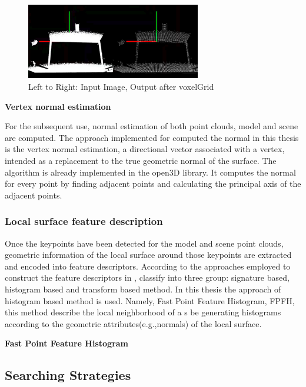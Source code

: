 \begin{figure}[!h]
\begin{center}
\includegraphics[width=3in]{figures03/voxelcloud1.png}
\caption{Left to Right: Input Image, Output after voxelGrid}%
\label{fig:voxeldown}
\end{center}
\end{figure}


\textbf{Vertex normal estimation}

For the subsequent use, normal estimation of both point clouds, model and scene are computed. The approach implemented for computed the normal in this thesis is the vertex normal estimation, a directional vector associated with a vertex, intended as a replacement to the true geometric normal of the surface. The algorithm is already implemented in the open3D \cite{open3d} library. 
It computes the normal for every point by finding adjacent points and calculating the principal axis of the adjacent points.

\subsubsection{Local surface feature description}

Once the keypoints have been detected for the model and scene point clouds, geometric information of the local surface around those keypoints are extracted and encoded into feature descriptors. According to the approaches employed to construct the feature descriptors in \cite{survey}, classify into three group: signature based, histogram based and transform based method. In this thesis the approach of histogram based method is used. Namely, Fast Point Feature Histogram, FPFH, this method describe the local neighborhood of a s be generating histograms according to the geometric attributes(e.g.,normals) of the local surface.

\textbf{Fast Point Feature Histogram}




\subsection{Searching Strategies}


